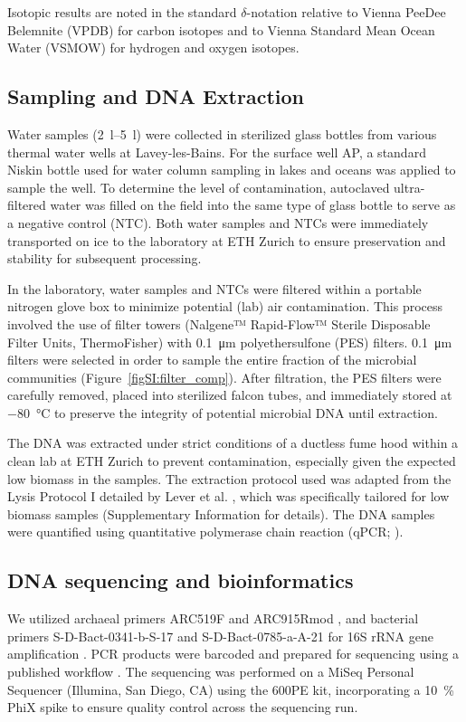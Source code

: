 Isotopic results are noted in the standard $\delta$-notation relative to Vienna PeeDee Belemnite (VPDB) for carbon isotopes and to Vienna Standard Mean Ocean Water (VSMOW) for hydrogen and oxygen isotopes.


\subsection{Sampling and DNA Extraction}

Water samples (\SIrange{2}{5}{\litre}) were collected in sterilized glass bottles from various thermal water wells at Lavey-les-Bains.
For the surface well AP, a standard Niskin bottle used for water column sampling in lakes and oceans was applied to sample the well. 
To determine the level of contamination, autoclaved ultra-filtered water was filled on the field into the same type of glass bottle to serve as a negative control (NTC).
Both water samples and NTCs were immediately transported on ice to the laboratory at ETH Zurich to ensure preservation and stability for subsequent processing.

In the laboratory, water samples and NTCs were filtered within a portable nitrogen glove box to minimize potential (lab) air contamination.
This process involved the use of filter towers (Nalgene™ Rapid-Flow™ Sterile Disposable Filter Units, ThermoFisher) with \SI{0.1}{\micro\metre} polyethersulfone (PES) filters.
\SI{0.1}{\micro\metre} filters were selected in order to sample the entire fraction of the microbial communities (Figure~\ref{figSI:filter_comp}).
After filtration, the PES filters were carefully removed, placed into sterilized falcon tubes, and immediately stored at \SI{-80}{\celsius} to preserve the integrity of potential microbial DNA until extraction.

The DNA was extracted under strict conditions of a ductless fume hood within a clean lab at ETH Zurich to prevent contamination, especially given the expected low biomass in the samples.
The extraction protocol used was adapted from the Lysis Protocol I detailed by Lever et al. \citep{lever2015modular}, which was specifically tailored for low biomass samples (Supplementary Information for details).
The DNA samples were quantified using quantitative polymerase chain reaction (qPCR; \cite{lever2015modular, deng2022qpcr, meier2024qpcr}).

\subsection{DNA sequencing and bioinformatics}
We utilized archaeal primers ARC519F and ARC915Rmod \citep{soerensen2006stratified, cadillo2006vertical}, and bacterial primers S-D-Bact-0341-b-S-17 and S-D-Bact-0785-a-A-21 for 16S rRNA gene amplification \citep{herlemann2011trasitions}.
PCR products were barcoded and prepared for sequencing using a published workflow \citep{han2020eutrophication}. 
The sequencing was performed on a MiSeq Personal Sequencer (Illumina, San Diego, CA) using the 600PE kit, incorporating a \SI{10}{\percent} PhiX spike to ensure quality control across the sequencing run.

